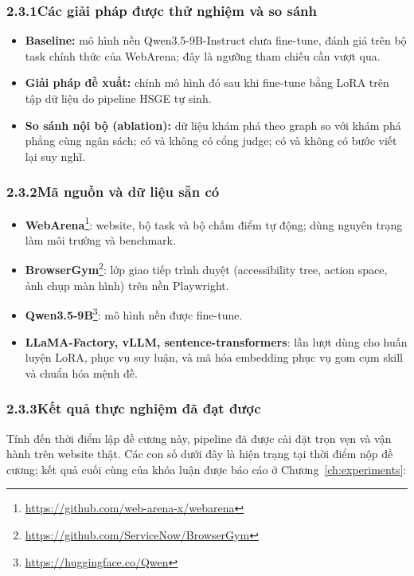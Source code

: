\subsubsection*{2.3.1\quad Các giải pháp được thử nghiệm và so sánh}

\begin{itemize}
  \item \textbf{Baseline:} mô hình nền Qwen3.5-9B-Instruct chưa fine-tune,
  đánh giá trên bộ task chính thức của WebArena; đây là ngưỡng tham chiếu
  cần vượt qua.
  \item \textbf{Giải pháp đề xuất:} chính mô hình đó sau khi fine-tune bằng
  LoRA trên tập dữ liệu do pipeline HSGE tự sinh.
  \item \textbf{So sánh nội bộ (ablation):} dữ liệu khám phá theo graph so với
  khám phá phẳng cùng ngân sách; có và không có cổng judge; có và không có
  bước viết lại suy nghĩ.
\end{itemize}

\subsubsection*{2.3.2\quad Mã nguồn và dữ liệu sẵn có}

\begin{itemize}
  \item \textbf{WebArena}\footnote{\url{https://github.com/web-arena-x/webarena}}:
  website, bộ task và bộ chấm điểm tự động; dùng nguyên trạng làm môi trường
  và benchmark.
  \item \textbf{BrowserGym}\footnote{\url{https://github.com/ServiceNow/BrowserGym}}:
  lớp giao tiếp trình duyệt (accessibility tree, action space, ảnh chụp màn
  hình) trên nền Playwright.
  \item \textbf{Qwen3.5-9B}\footnote{\url{https://huggingface.co/Qwen}}: mô
  hình nền được fine-tune.
  \item \textbf{LLaMA-Factory, vLLM, sentence-transformers}: lần lượt dùng cho
  huấn luyện LoRA, phục vụ suy luận, và mã hóa embedding phục vụ gom cụm skill
  và chuẩn hóa mệnh đề.
\end{itemize}

\subsubsection*{2.3.3\quad Kết quả thực nghiệm đã đạt được}

Tính đến thời điểm lập đề cương này, pipeline đã được cài đặt trọn vẹn và vận
hành trên website thật. Các con số dưới đây là hiện trạng tại thời điểm nộp đề
cương; kết quả cuối cùng của khóa luận được báo cáo ở
Chương~\ref{ch:experiments}:

